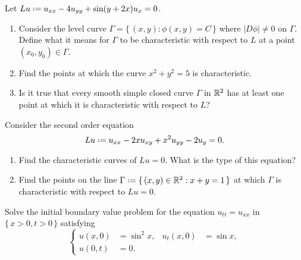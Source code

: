 \begin{problem}
  Let \(Lu\defeq u_{xx}-4u_{yy}+\sin(y+2x)u_{x}=0\).
  \begin{enumerate}[label=(\alph*),noitemsep]
  \item Consider the level curve \(\Gamma=\{\,(x,y):\phi(x,y)=C\,\}\)
    where \(|D\phi|\neq 0\) on \(\Gamma\). Define what it means for
    \(\Gamma\) to be characteristic with respect to \(L\) at a point
    \((x_0,y_0)\in\Gamma\).
  \item Find the points at which the curve \(x^2+y^2=5\) is
    characteristic.
  \item Is it true that every smooth simple closed curve \(\Gamma\) in
    \(\mathbb{R}^2\) has at least one point at which it is characteristic with
    respect to \(L\)?
  \end{enumerate}
\end{problem}
\begin{solution*}
\end{solution*}

\begin{problem}
  Consider the second order equation
  \[
    Lu\defeq u_{xx}-2xu_{xy}+x^2u_{yy}-2u_y=0.
  \]
  \begin{enumerate}[label=(\alph*),noitemsep]
  \item Find the characteristic curves of \(Lu=0\). What is the type of
    this equation?
  \item Find the points on the line
    \(\Gamma\defeq\{\,(x,y)\in\R^2:x+y=1\,\}\) at which \(\Gamma\) is
    characteristic with respect to \(Lu=0\).
  \end{enumerate}
\end{problem}
\begin{solution*}
\end{solution*}

\begin{problem}
  Solve the initial boundary value problem for the equation
  \(u_{tt}=u_{xx}\) in \(\{\,x>0,t>0\,\}\) satisfying
    \[
     \left\{
       \begin{aligned}
         u(x,0)&=\sin^2x,&u_t(x,0)&=\sin x,\\
         u(0,t)&=0.
      \end{aligned}
    \right.
  \]
\end{problem}
\begin{solution*}
\end{solution*}

